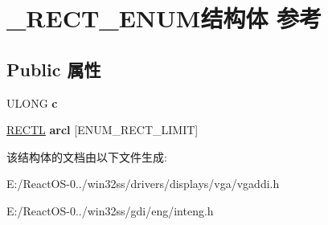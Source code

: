 \hypertarget{struct___r_e_c_t___e_n_u_m}{}\section{\+\_\+\+R\+E\+C\+T\+\_\+\+E\+N\+U\+M结构体 参考}
\label{struct___r_e_c_t___e_n_u_m}
\subsection*{Public 属性}
\begin{DoxyCompactItemize}
\item 
\mbox{\label{struct___r_e_c_t___e_n_u_m_ad2e8de5bd2c54eca4deb85b4b345b128}} 
U\+L\+O\+NG {\bfseries c}
\item 
\mbox{\label{struct___r_e_c_t___e_n_u_m_afdcf92f0bfd09cb19c6f6d09656c0c7e}} 
\hyperlink{struct___r_e_c_t_l}{R\+E\+C\+TL} {\bfseries arcl} \mbox{[}E\+N\+U\+M\+\_\+\+R\+E\+C\+T\+\_\+\+L\+I\+M\+IT\mbox{]}
\end{DoxyCompactItemize}


该结构体的文档由以下文件生成\+:\begin{DoxyCompactItemize}
\item 
E\+:/\+React\+O\+S-\/0../win32ss/drivers/displays/vga/vgaddi.\+h\item 
E\+:/\+React\+O\+S-\/0../win32ss/gdi/eng/inteng.\+h\end{DoxyCompactItemize}
